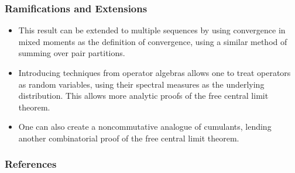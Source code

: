 \documentclass{beamer}
\begin{document}
\begin{frame}
  \frametitle{Ramifications and Extensions}
  \begin{itemize}
    \item This result can be extended to multiple sequences by using convergence in mixed moments as the definition of convergence, using a similar method of summing over pair partitions.\pause
    \item Introducing techniques from operator algebras allows one to treat operators as random variables, using their spectral measures as the underlying distribution. This allows more analytic proofs of the free central limit theorem.\pause
    \item One can also create a noncommutative analogue of cumulants, lending another combinatorial proof of the free central limit theorem.
  \end{itemize}
\end{frame}
\begin{frame}[allowframebreaks]
  \frametitle{References}
  \nocite{*}
  \printbibliography
\end{frame}
\end{document}
